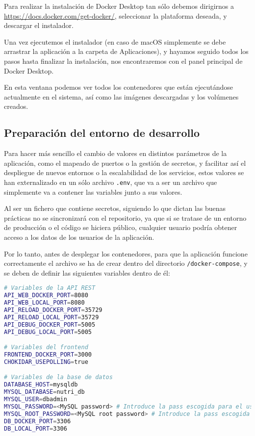 
Para realizar la instalación de Docker Desktop tan sólo debemos dirigirnos a \url{https://docs.docker.com/get-docker/}, seleccionar la plataforma deseada, y descargar el instalador.


Una vez ejecutemos el instalador (en caso de macOS simplemente se debe arrastrar la aplicación a la carpeta de Aplicaciones), y hayamos seguido todos los pasos hasta finalizar la instalación, nos encontraremos con el panel principal de Docker Desktop. 


En esta ventana podemos ver todos los contenedores que están ejecutándose actualmente en el sistema, así como las imágenes descargadas y los volúmenes creados.

\subsection{Preparación del entorno de desarrollo} \label{entorno-desarrollo}

Para hacer más sencillo el cambio de valores en distintos parámetros de la aplicación, como el mapeado de puertos o la gestión de secretos, y facilitar así el despliegue de nuevos entornos o la escalabilidad de los servicios, estos valores se han externalizado en un sólo archivo \verb,.env,, que va a ser un archivo que simplemente va a contener las variables junto a sus valores. 

Al ser un fichero que contiene secretos, siguiendo lo que dictan las buenas prácticas no se sincronizará con el repositorio, ya que si se tratase de un entorno de producción o el código se hiciera público, cualquier usuario podría obtener acceso a los datos de los usuarios de la aplicación.

Por lo tanto, antes de desplegar los contenedores, para que la aplicación funcione correctamente el archivo se ha de crear dentro del directorio \verb,/docker-compose,, y se deben de definir las siguientes variables dentro de él:

\begin{lstlisting}[language=Bash]
# Variables de la API REST
API_WEB_DOCKER_PORT=8080
API_WEB_LOCAL_PORT=8080
API_RELOAD_DOCKER_PORT=35729
API_RELOAD_LOCAL_PORT=35729
API_DEBUG_DOCKER_PORT=5005
API_DEBUG_LOCAL_PORT=5005

# Variables del frontend
FRONTEND_DOCKER_PORT=3000
CHOKIDAR_USEPOLLING=true

# Variables de la base de datos
DATABASE_HOST=mysqldb
MYSQL_DATABASE=nutri_db
MYSQL_USER=dbadmin
MYSQL_PASSWORD=<MySQL password> # Introduce la pass escogida para el usuario creado en el paso anterior
MYSQL_ROOT_PASSWORD=<MySQL root password> # Introduce la pass escogida para el usuario root de MySQL
DB_DOCKER_PORT=3306
DB_LOCAL_PORT=3306
\end{lstlisting}

